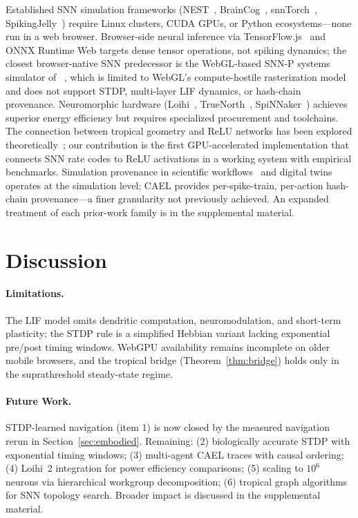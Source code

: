 \documentclass[10pt]{article}
\newcommand{\cael}{\textsc{CAEL}}
\begin{document}
Established SNN simulation frameworks (NEST~\cite{gewaltig2007nest}, BrainCog~\cite{tang2024braincog}, snnTorch~\cite{eshraghian2023training}, SpikingJelly~\cite{fang2023spikingjelly}) require Linux clusters, CUDA GPUs, or Python ecosystems---none run in a web browser.
Browser-side neural inference via TensorFlow.js~\cite{smilkov2019tensorflow} and ONNX Runtime Web targets dense tensor operations, not spiking dynamics; the closest browser-native SNN predecessor is the WebGL-based SNN-P systems simulator of \citeauthor{cabarle2022webgl}~\cite{cabarle2022webgl}, which is limited to WebGL's compute-hostile rasterization model and does not support STDP, multi-layer LIF dynamics, or hash-chain provenance.
Neuromorphic hardware (Loihi~\cite{davies2018loihi}, TrueNorth~\cite{merolla2014truenorth}, SpiNNaker~\cite{furber2014spinnaker}) achieves superior energy efficiency but requires specialized procurement and toolchains.
The connection between tropical geometry and ReLU networks has been explored theoretically~\cite{zhang2018tropical, alfarra2022decision, maragos2021tropical}; our contribution is the first GPU-accelerated implementation that connects SNN rate codes to ReLU activations in a working system with empirical benchmarks.
Simulation provenance in scientific workflows~\cite{simmhan2005survey} and digital twins~\cite{tao2019digital} operates at the simulation level; \cael{} provides per-spike-train, per-action hash-chain provenance---a finer granularity not previously achieved.
An expanded treatment of each prior-work family is in the supplemental material.

\section{Discussion}
\label{sec:discussion}

\paragraph{Limitations.}
The LIF model omits dendritic computation, neuromodulation, and short-term plasticity; the STDP rule is a simplified Hebbian variant lacking exponential pre/post timing windows.
WebGPU availability remains incomplete on older mobile browsers, and the tropical bridge (Theorem~\ref{thm:bridge}) holds only in the suprathreshold steady-state regime.

\paragraph{Future Work.}
\label{sec:future}
STDP-learned navigation (item 1) is now closed by the measured navigation rerun in Section~\ref{sec:embodied}.
Remaining: (2) biologically accurate STDP with exponential timing windows; (3) multi-agent \cael{} traces with causal ordering; (4) Loihi~2 integration for power efficiency comparisons; (5) scaling to $10^6$ neurons via hierarchical workgroup decomposition; (6) tropical graph algorithms for SNN topology search.
Broader impact is discussed in the supplemental material.
\end{document}
